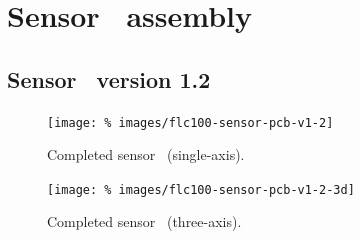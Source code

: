 \chapter[Sensor PCB assembly]{Sensor \pcb\ assembly}

\section[Sensor PCB version 1.2]{Sensor \pcb\ version 1.2}

\begin{figure}
  \centering
  \texttt{[image: \%
    images/flc100-sensor-pcb-v1-2]}
  \caption[Completed sensor PCB (single-axis)]{%
    Completed sensor \pcb\ (single-axis). }
  \label{fig:sensor-pcb-v1.2}
\end{figure}
\begin{figure}
  \centering
  \texttt{[image: \%
    images/flc100-sensor-pcb-v1-2-3d]}
  \caption[Completed sensor PCB (three-axis)]{%
    Completed sensor \pcb\ (three-axis). }
  \label{fig:sensor-pcb-v1.2-3d}
\end{figure}

